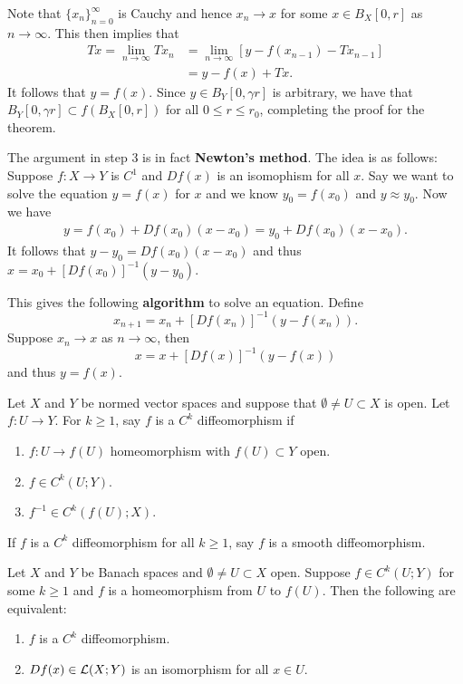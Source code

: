 \documentclass[a4paper]{article}
\renewcommand{\seqinfn}[1]{\{ #1 \}_{n=0}^\infty}
\begin{document}
Note that $\seqinfn{x_n}$ is Cauchy and hence $x_n \to x$ for some $x \in
B_X[0, r]$ as $n \to \infty$. This then implies that
\[
  \begin{aligned}
    T x = \lim_{n \to \infty} T x_n
     & = \lim_{n \to \infty} [y - f(x_{n - 1}) - T x_{n - 1}] \\
     & = y - f(x) + T x.
  \end{aligned}
\]
It follows that $y = f(x)$. Since $y \in B_Y [0, \gamma r]$ is
  arbitrary, we have that $B_Y [0, \gamma r] \subset f(B_X [0, r])$ for
  all $0 \leq r \leq r_0$, completing the proof for the theorem.

\begin{remark}
  The argument in step 3 is in fact \textbf{Newton's method}. The idea is
  as follows: Suppose $f : X \to Y$ is $C^1$ and $Df(x)$ is an isomophism
  for all $x$. Say we want to solve the equation $y = f(x)$ for $x$ and we
  know $y_0 = f(x_0)$ and $y \approx y_0$. Now we have
  \[
    \begin{aligned}
      y = f(x_0) + Df(x_0) (x - x_0)
      = y_0 + Df(x_0) (x - x_0).
    \end{aligned}
  \]
  It follows that $y - y_0 = Df(x_0) (x - x_0)$ and thus $x = x_0 + [Df
  (x_0)]^{-1} (y - y_0)$.

  This gives the following \textbf{algorithm} to solve an equation. Define
  \[
    x_{n + 1} = x_n + [Df(x_n)]^{-1} (y - f(x_n)).
  \]
  Suppose $x_n \to x$ as $n \to \infty$, then
  \[
    x = x + [Df(x)]^{-1} (y - f(x))
  \]
  and thus $y = f(x)$.
\end{remark}

\begin{defi}[diffeomorphism]
  Let $X$ and $Y$ be normed vector spaces and suppose that
  $\emptyset \neq U \subset X$ is open.
  Let $f : U \to Y$. For $k \geq 1$, say $f$ is a
  $C^k$ diffeomorphism if
  \begin{enumerate}
    \item $f: U \to f(U)$ homeomorphism with $f(U) \subset Y$
          open.
    \item $f \in C^k(U ; Y)$.
    \item $f^{-1} \in C^k(f(U); X)$.
  \end{enumerate}
  If $f$ is a $C^k$ diffeomorphism for all $k \geq 1$,
  say $f$ is a smooth diffeomorphism.
\end{defi}

\begin{thm}
  Let $X$ and $Y$ be Banach spaces and $\emptyset \neq U \subset X$ open.
  Suppose $f \in C^k(U; Y)$ for some $k \geq 1$ and $f$ is a homeomorphism
  from $U$ to $f(U)$. Then the following are equivalent:
  \begin{enumerate}
    \item $f$ is a $C^k$ diffeomorphism.
    \item $Df(x) \in \mathcal{L}(X; Y)$ is an isomorphism for all $x \in U$.
  \end{enumerate}
\end{thm}
\end{document}
